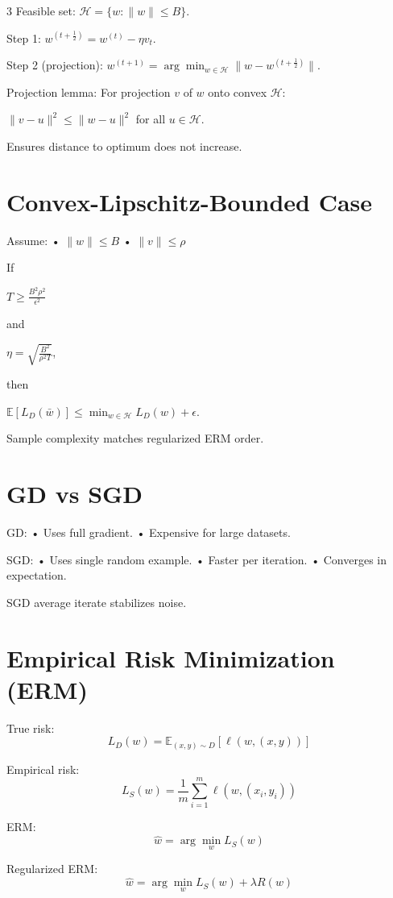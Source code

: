 \documentclass[8pt,fleqn]{extarticle}
\begin{document}
\begin{multicols}{3}
Feasible set:
$\mathcal H=\{w:\|w\|\le B\}$.

Step 1:
$w^{(t+\frac12)}=w^{(t)}-\eta v_t$.

Step 2 (projection):
$w^{(t+1)}=\arg\min_{w\in\mathcal H}
\|w-w^{(t+\frac12)}\|$.

Projection lemma:
For projection $v$ of $w$ onto convex $\mathcal H$:

$\|v-u\|^2\le\|w-u\|^2$
for all $u\in\mathcal H$.

Ensures distance to optimum does not increase.


\section*{Convex-Lipschitz-Bounded Case}

Assume:
• $\|w\|\le B$
• $\|v\|\le\rho$

If

$T\ge \frac{B^2\rho^2}{\epsilon^2}$

and

$\eta=\sqrt{\frac{B^2}{\rho^2 T}}$,

then

$\mathbb E[L_D(\bar w)]
\le
\min_{w\in\mathcal H}L_D(w)+\epsilon$.

Sample complexity matches
regularized ERM order.


\section*{GD vs SGD}

GD:
• Uses full gradient.
• Expensive for large datasets.

SGD:
• Uses single random example.
• Faster per iteration.
• Converges in expectation.

SGD average iterate stabilizes noise.

\section*{Empirical Risk Minimization (ERM)}

True risk:
\[
L_D(w)=\mathbb E_{(x,y)\sim D}[\ell(w,(x,y))]
\]

Empirical risk:
\[
L_S(w)=\frac1m\sum_{i=1}^m \ell(w,(x_i,y_i))
\]

ERM:
\[
\hat w=\arg\min_w L_S(w)
\]

Regularized ERM:
\[
\hat w=\arg\min_w L_S(w)+\lambda R(w)
\]


\end{multicols}
\end{document}
